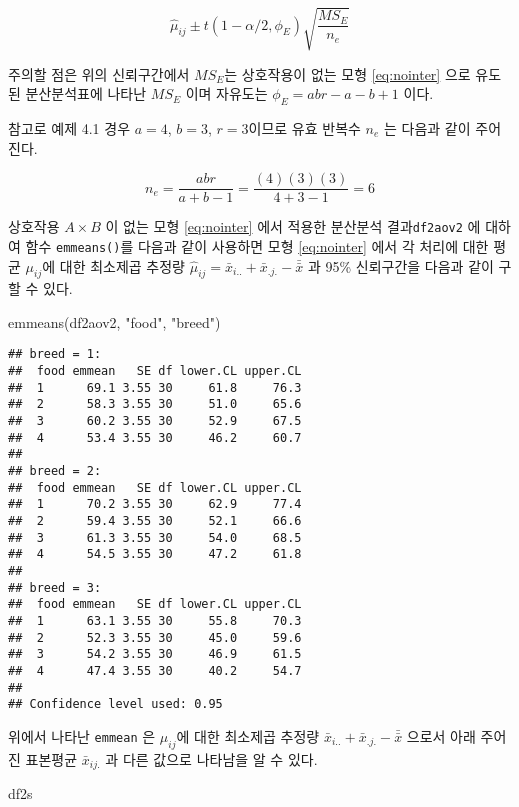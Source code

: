 \documentclass[
]{book}
\newenvironment{Shaded}{\begin{snugshade}}{\end{snugshade}}
\newcommand{\FunctionTok}[1]{\textcolor[rgb]{0.00,0.00,0.00}{#1}}
\newcommand{\NormalTok}[1]{#1}
\newcommand{\StringTok}[1]{\textcolor[rgb]{0.31,0.60,0.02}{#1}}
\begin{document}
\[ \hat \mu_{ij} \pm t(1-\alpha/2, \phi_E) \sqrt{ \frac{MS_E}{n_e}} \]

주의할 점은 위의 신뢰구간에서 \(MS_E\)는 상호작용이 없는 모형 \eqref{eq:nointer} 으로 유도된 분산분석표에 나타난 \(MS_E\) 이며 자유도는 \(\phi_E = abr-a-b+1\) 이다.

참고로 예제 4.1 경우 \(a=4\), \(b=3\), \(r=3\)이므로 유효 반복수 \(n_e\) 는 다음과 같이 주어진다.

\[ n_e = \frac{abr}{a+b-1} = \frac{(4)(3)(3)}{4+3-1} = 6  \]

상호작용 \(A \times B\) 이 없는 모형 \eqref{eq:nointer} 에서 적용한 분산분석 결과\texttt{df2aov2} 에 대하여 함수 \texttt{emmeans()}를 다음과 같이 사용하면 모형 \eqref{eq:nointer} 에서 각 처리에 대한 평균 \(\mu_{ij}\)에 대한 최소제곱 추정량 \(\hat \mu_{ij}=\bar x_{i..} + \bar x_{.j.} - \bar{\bar x}\) 과 95\% 신뢰구간을 다음과 같이 구할 수 있다.

\begin{Shaded}
\begin{Highlighting}[]
\FunctionTok{emmeans}\NormalTok{(df2aov2, }\StringTok{"food"}\NormalTok{, }\StringTok{"breed"}\NormalTok{)}
\end{Highlighting}
\end{Shaded}

\begin{verbatim}
## breed = 1:
##  food emmean   SE df lower.CL upper.CL
##  1      69.1 3.55 30     61.8     76.3
##  2      58.3 3.55 30     51.0     65.6
##  3      60.2 3.55 30     52.9     67.5
##  4      53.4 3.55 30     46.2     60.7
## 
## breed = 2:
##  food emmean   SE df lower.CL upper.CL
##  1      70.2 3.55 30     62.9     77.4
##  2      59.4 3.55 30     52.1     66.6
##  3      61.3 3.55 30     54.0     68.5
##  4      54.5 3.55 30     47.2     61.8
## 
## breed = 3:
##  food emmean   SE df lower.CL upper.CL
##  1      63.1 3.55 30     55.8     70.3
##  2      52.3 3.55 30     45.0     59.6
##  3      54.2 3.55 30     46.9     61.5
##  4      47.4 3.55 30     40.2     54.7
## 
## Confidence level used: 0.95
\end{verbatim}

위에서 나타난 \texttt{emmean} 은 \(\mu_{ij}\)에 대한 최소제곱 추정량 \(\bar x_{i..} + \bar x_{.j.} - \bar{\bar x}\) 으로서 아래 주어진 표본평균 \(\bar x_{ij.}\) 과 다른 값으로 나타남을 알 수 있다.

\begin{Shaded}
\begin{Highlighting}[]
\NormalTok{df2s}
\end{Highlighting}
\end{Shaded}
\end{document}
